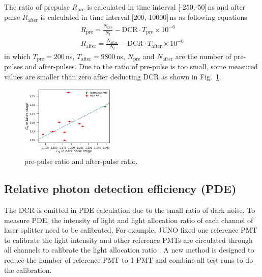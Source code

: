 The ratio of prepulse $R_{\mathrm{pre}}$ is calculated in time interval [-250,-50]\,ns and after pulse $R_{\mathrm{after}}$ is calculated in time interval [200,-10000]\,ns as following equations
\begin{align}
    R_{\mathrm{pre}} = \frac{N_{\mathrm{pre}}}{N_t} - \mathrm{DCR}\cdot T_{\mathrm{pre}}\times10^{-6}\\
    R_{\mathrm{after}} = \frac{N_{\mathrm{after}}}{N_t} - \mathrm{DCR}\cdot T_{\mathrm{after}}\times10^{-6}
\end{align}
in which $T_{\mathrm{pre}}=200$\,ns, $T_{\mathrm{after}}=9800$\,ns, $N_{\mathrm{pre}}$ and $N_{\mathrm{after}}$ are the number of pre-pulses and after-pulses. Due to the ratio of pre-pulse is too small, some measured values are smaller than zero after deducting DCR as shown in Fig.~\ref{fig:prepulseCompare}.

\begin{figure}[!htbp]
    \centering
    \includegraphics[width=0.4\textwidth,page=11]{figures/result/compare.pdf}
    \caption{pre-pulse ratio and after-pulse ratio.}
    \label{fig:prepulseCompare}
\end{figure}

\subsection{Relative photon detection efficiency (PDE)}
The DCR is omitted in PDE calculation due to the small ratio of dark noise. To measure PDE, the intensity of light and light allocation ratio of each channel of laser splitter need to be calibrated. For example, JUNO fixed one reference PMT to calibrate the light intensity and other reference PMTs are circulated through all channels to calibrate the light allocation ratio \cite{Wonsak_2021}. A new method is designed to reduce the number of reference PMT to 1 PMT and combine all test runs to do the calibration.

